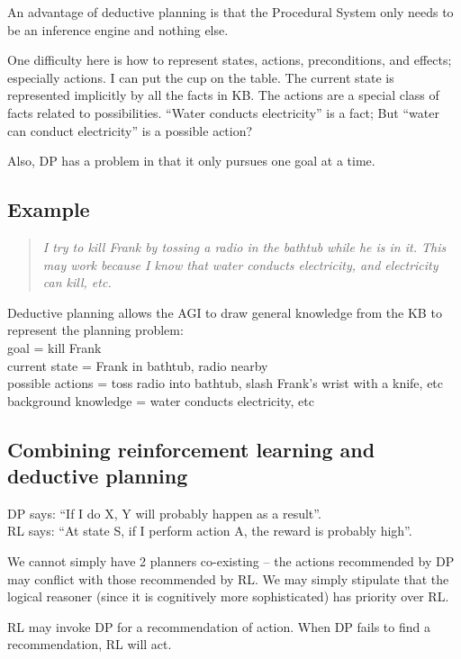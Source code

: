 An advantage of deductive planning is that the Procedural System only needs to be an inference engine and nothing else.

One difficulty here is how to represent states, actions, preconditions, and effects;  especially actions.  I can put the cup on the table.  The current state is represented implicitly by all the facts in KB.  The actions are a special class of facts related to possibilities.  ``Water conducts electricity'' is a fact;  But ``water can conduct electricity'' is a possible action?  

Also, DP has a problem in that it only pursues one goal at a time.

\subsection{Example}

\begin{quote}
\emph{I try to kill Frank by tossing a radio in the bathtub while he is in it.  This may work because I know that water conducts electricity, and electricity can kill, etc.}
\end{quote}

Deductive planning allows the AGI to draw general knowledge from the KB to represent the planning problem:\\
\hspace*{1cm} goal = kill Frank\\
\hspace*{1cm} current state = Frank in bathtub, radio nearby\\
\hspace*{1cm} possible actions = toss radio into bathtub, slash Frank's wrist with a knife, etc\\
\hspace*{1cm} background knowledge = water conducts electricity, etc

\subsection{Combining reinforcement learning and deductive planning}
\label{sec:combine-DP-RL}

DP says:  ``If I do X, Y will probably happen as a result''.\\
RL says:  ``At state S, if I perform action A, the reward is probably high''.

We cannot simply have 2 planners co-existing -- the actions recommended by DP may conflict with those recommended by RL.  We may simply stipulate that the logical reasoner (since it is cognitively more sophisticated) has priority over RL.

RL may invoke DP for a recommendation of action.  When DP fails to find a recommendation, RL will act.

